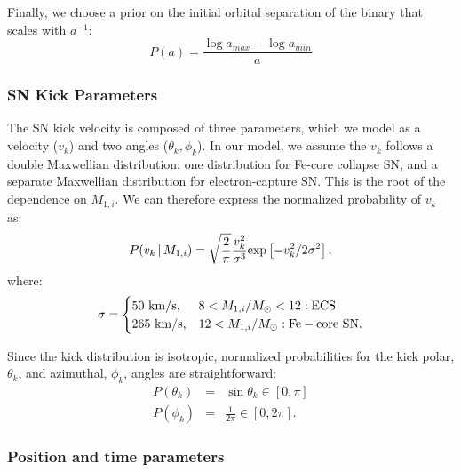 \documentclass[12pt, preprint]{aastex}
\newcommand{\given}{\,|\,}
\newcommand{\Msun}{\ifmmode {M_{\odot}}\else${M_{\odot}}$\fi}
\begin{document}
Finally, we choose a prior on the initial orbital separation of the binary that scales with $a^{-1}$:
\begin{equation}
P(a) = \frac{\log a_{max} - \log a_{min}}{a}
\end{equation}


\subsubsection{SN Kick Parameters}

The SN kick velocity is composed of three parameters, which we model as a velocity ($v_k$) and two angles ($\theta_k, \phi_k$). In our model, we assume the $v_k$ follows a double Maxwellian distribution: one distribution for Fe-core collapse SN, and a separate Maxwellian distribution for electron-capture SN. This is the root of the dependence on $M_{1,i}$. We can therefore express the normalized probability of $v_k$ as:
\begin{equation}
P(v_k \given M_{1,i}) = \sqrt{\frac{2}{\pi}} \frac{v_k^2} {\sigma^3} {\rm exp} \left[ -v_k^2 / 2 \sigma^2 \right], \label{eq:P_v_k}
\end{equation}
where:
\begin{equation}
\sigma = 
\begin{cases} 
      50\ {\rm km/s}, & 8 < M_{1,i}/\Msun < 12: {\rm ECS}\\
     265\ {\rm km/s}, & 12 < M_{1,i}/\Msun: {\rm Fe-core\ SN}.
   \end{cases}
\end{equation}

Since the kick distribution is isotropic, normalized probabilities for the kick polar, $\theta_k$, and azimuthal, $\phi_k$, angles are straightforward:
\begin{eqnarray}
P(\theta_k) &=& \sin \theta_k \in [0, \pi] \label{eq:P_theta_k} \\
P(\phi_k) &=& \frac{1}{2 \pi} \in [0, 2\pi] . \label{eq:P_phi_k}
\end{eqnarray}


\subsubsection{Position and time parameters}
\end{document}
